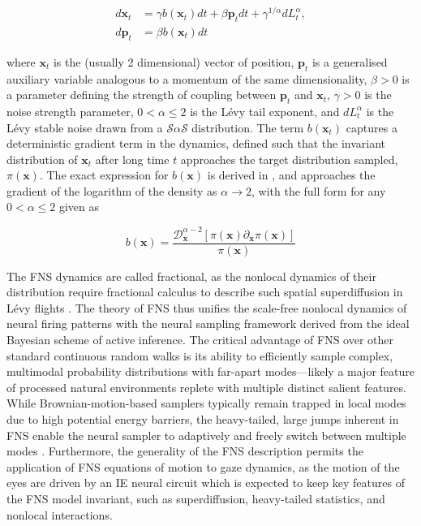 \begin{equation}
\label{eq:fns}
\begin{aligned}
	d\textbf{x}_t &= \gamma b(\textbf{x}_t)dt + \beta \textbf{p}_t dt + \gamma^{1/\alpha} dL_t^{\alpha}, \\
	d\textbf{p}_t &= \beta b(\textbf{x}_t) dt
\end{aligned}
\end{equation}

where $\textbf{x}_t$ is the (usually 2 dimensional) vector of position, $\textbf{p}_t$ is a generalised auxiliary variable analogous to a momentum of the same dimensionality, $\beta > 0$ is a parameter defining the strength of coupling between $\textbf{p}_t$ and $\textbf{x}_t$, $\gamma > 0$ is the noise strength parameter, $ 0 < \alpha \leq 2$ is the Lévy tail exponent, and $dL_t^{\alpha}$ is the Lévy stable noise drawn from a $\mathcal{S}\alpha\mathcal{S}$ distribution. The term $b(\textbf{x}_t)$ captures a deterministic gradient term in the dynamics, defined such that the invariant distribution of $\textbf{x}_t$ after long time $t$ approaches the target distribution sampled, $\pi(\textbf{x})$. The exact expression for $b(\textbf{x})$ is derived in \cite{qi_fractional_2022}, and approaches the gradient of the logarithm of the density as $\alpha \rightarrow 2$, with the full form for any $ 0 < \alpha \leq 2$ given as

\begin{equation}
	b(\textbf{x}) = \frac{\mathcal{D}^{\alpha - 2}_{\textbf{x}}[\pi(\textbf{x}) \partial_{\textbf{x}} \pi(\textbf{x})]}{\pi(\textbf{x})}
\end{equation}

The FNS dynamics are called fractional, as the nonlocal dynamics of their distribution require fractional calculus to describe such spatial superdiffusion in Lévy flights \cite{tarasov_general_2021}. The theory of FNS thus unifies the scale-free nonlocal dynamics of neural firing patterns with the neural sampling framework derived from the ideal Bayesian scheme of active inference. The critical advantage of FNS over other standard continuous random walks is its ability to efficiently sample complex, multimodal probability distributions with far-apart modes—likely a major feature of processed natural environments replete with multiple distinct salient features. While Brownian-motion-based samplers typically remain trapped in local modes due to high potential energy barriers, the heavy-tailed, large jumps inherent in FNS enable the neural sampler to adaptively and freely switch between multiple modes \cite{neal_sampling_1996, latuszynski_mcmc_2025, simsekli_fractional_nodate, metzler_random_2000}. Furthermore, the generality of the FNS description permits the application of FNS equations of motion to gaze dynamics, as the motion of the eyes are driven by an IE neural circuit which is expected to keep key features of the FNS model invariant, such as superdiffusion, heavy-tailed statistics, and nonlocal interactions.

